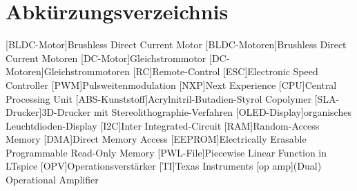 

\pagestyle {fancy}
\rhead{\thepage} \chead{} 
\cfoot{}

\section*{Abkürzungsverzeichnis}

\begin{acronym}
	[BLDC-Motor]{Brushless Direct Current Motor}
	[BLDC-Motoren]{Brushless Direct Current Motoren}
	[DC-Motor]{Gleich\-strom\-motor}
	[DC-Motoren]{Gleich\-strom\-motoren}
	[RC]{Remote-Control}
	[ESC]{Electronic Speed Controller}
	[PWM]{Puls\-weiten\-modulation}
	[NXP]{Next Experience}
	[CPU]{Central Processing Unit}
	[ABS-Kunststoff]{Acrylnitril-Butadien-Styrol Copolymer}
	[SLA-Drucker]{3D-Drucker mit Stereolithographie-Verfahren}
	[OLED-Display]{organisches Leuchtdioden-Display}
	[I2C]{Inter Integrated-Circuit}
	[RAM]{Random-Access Memory}
	[DMA]{Direct Memory Access}
	[EEPROM]{Electrically Erasable Programmable Read-Only Memory}
	[PWL-File]{Piecewise Linear Function in LTspice}
	[OPV]{Operationsverstärker}
	[TI]{Texas Instruments}
	[op amp]{(Dual) Operational Amplifier}
\end{acronym}

\newpage
